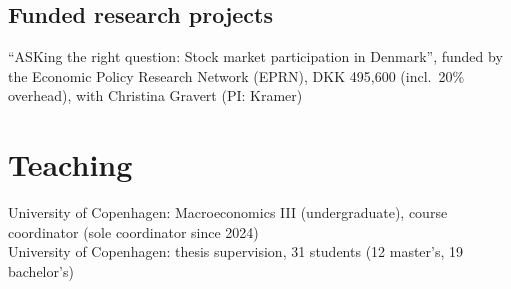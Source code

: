 \documentclass[11pt]{article} %
\begin{document}
\subsection*{Funded research projects}
 ``ASKing the right question: Stock market participation in Denmark'', funded by the Economic Policy Research Network (EPRN), DKK 495,600 (incl.\ 20\% overhead), with Christina Gravert (PI: Kramer)



\section*{Teaching}
 University of Copenhagen: Macroeconomics III (undergraduate), course coordinator (sole coordinator since 2024) \\
 University of Copenhagen: thesis supervision, 31 students (12 master's, 19 bachelor's) \\


\end{document}
